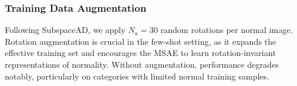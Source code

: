 \subsubsection{Training Data Augmentation}

Following SubspaceAD, we apply $N_a = 30$ random rotations per normal image.
Rotation augmentation is crucial in the few-shot setting, as it expands the effective training set and encourages the MSAE to learn rotation-invariant representations of normality.
Without augmentation, performance degrades notably, particularly on categories with limited normal training samples.
